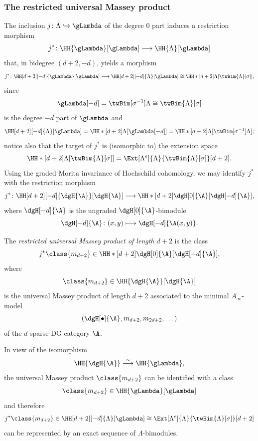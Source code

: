 \documentclass[a4paper]{amsart}
\begin{document}
\subsubsection{The restricted universal Massey product}

The inclusion $j\colon\Lambda\hookrightarrow\gLambda$ of the degree $0$ part
induces a restriction morphism
\[
  j^*\colon\HH{\gLambda}[\gLambda]\longrightarrow\HH{\Lambda}[\gLambda]
\]
that, in bidegree $(d+2,-d)$, yields a morphism
\[
  j^*\colon\HH[d+2][-d]{\gLambda}[\gLambda]\longrightarrow\HH[d+2][-d]{\Lambda}[\gLambda]\cong\HH*[d+2]{\Lambda}[\twBim{\Lambda}[\sigma]],
\]
since
\[
  \gLambda[-d]=\twBim[\sigma^{-1}]{\Lambda}\cong\twBim{\Lambda}[\sigma]
\]
is the degree $-d$ part of $\gLambda$ and
\[
  \HH[d+2][-d]{\Lambda}[\gLambda]=\HH*[d+2]{\Lambda}[\gLambda[-d]]=\HH*[d+2]{\Lambda}[\twBim[\sigma^{-1}]{\Lambda}];
\]
notice also that the target of $j^*$ is (isomorphic to) the extension space
\[
  \HH*[d+2]{\Lambda}[\twBim{\Lambda}[\sigma]]=\Ext[\Lambda^e]{\Lambda}{\twBim{\Lambda}[\sigma]}[d+2].
\]
Using the graded Morita invariance of Hochschild cohomology, we may identify
$j^*$ with the restriction morphism
\[
  j^*\colon\HH[d+2][-d]{\dgH{\A}}[\dgH{\A}]\longrightarrow\HH*[d+2]{\dgH[0]{\A}}[\dgH[-d]{\A}],
\]
where $\dgH[-d]{\A}$ is the ungraded $\dgH[0]{\A}$-bimodule
\[
  \dgH[-d]{\A}\colon(x,y)\longmapsto\dgH[-d]{\A(x,y)}.
\]

\begin{definition}
  \label{def:restricted_universal_Massey}
  The \emph{restricted universal Massey product of length $d+2$} is the class
  \[
    j^*\class{m_{d+2}}\in\HH*[d+2]{\dgH[0]{\A}}[\dgH[-d]{\A}],
  \]
  where
  \[
    \class{m_{d+2}}\in\HH{\dgH{\A}}[\dgH{\A}]
  \]
  is the universal Massey product of length $d+2$ associated to the minimal
  $A_\infty$-model
  \[
    (\dgH[\bullet]{\A},m_{d+2},m_{2d+2},\dots)
  \]
  of the $d$-sparse DG category $\A$.
\end{definition}

\begin{remark}
  In view of the isomorphism
  \[
    \HH{\dgH{\A}}\stackrel{\sim}{\longrightarrow}\HH{\gLambda},
  \]
  the universal Massey product $\class{m_{d+2}}$ can be identified with a class
  \[
    \class{m_{d+2}}\in\HH{\gLambda}[\gLambda]
  \]
  and therefore
  \[
    j^*\class{m_{d+2}}\in\HH[d+2][-d]{\Lambda}[\gLambda]\cong\Ext[\Lambda^e]{\Lambda}{\twBim{\Lambda}[\sigma]}[d+2]
  \]
  can be represented by an exact sequence of $\Lambda$-bimodules.
\end{remark}
\end{document}
